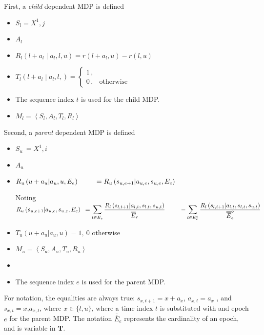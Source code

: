 \documentclass[compsoc,journal,letterpaper,10pt,draftcls,twocolumn]{IEEEtran}
\begin{document}
First, a \emph{child} dependent MDP is defined

\begin{itemize}
\item
  \(S_{l}  = X^{1}, j\)
\item
  \(A_{l}\)
\item
  \(R_{l}\left( l + a_{l}\middle| a_{l},l,u \right) = r\left( l + a_{l}, u \right) - r(l,u)\)
\item
  $T_{l}\left( l + a_{l}\middle| a_{l}, l, \right) = \left\{ \begin{array}{ll}  1\,, & \\ 0\,, & \text{otherwise} \end{array} \right.$ 
\item
  The sequence index \(t\) is used for the child MDP.
\item
  \(M_{l} = \left\langle S_{l}, A_{l} ,T_{l}, R_{l} \right\rangle\)
\end{itemize}

Second, a \emph{parent} dependent MDP is defined

\begin{itemize}
\item
  \(S_{u}\  = X^{1},i\)
\item
  \(A_{u}\)
\item
  \(R_{u}\left( u + a_{u} \middle|a_{u}, u, E_{e} \right) \\ {\ }\qquad = R_{u}\left( s_{u,e + 1}\middle| a_{u,e}, s_{u,e}, E_{e} \right)\)

    Noting\\
    \(R_{u}\left( s_{u,e + 1}|a_{u,e}, s_{u,e}, E_{e} \right) \\ {\ } = \displaystyle\sum_{t \in E_{e}}^{\ }\frac{R_{l}\left( s_{l,t + 1}|a_{l,t}, s_{l,t}, s_{u,t} \right)}{\overline{\overline E}_{e}} \\ {\ } \qquad - \displaystyle\sum_{t \in E_{e}^{o}}^{\ }\frac{R_{l}\left( s_{l,t + 1}|a_{l,t},s_{l,t},s_{u,t} \right)}{\overline{\overline E}_{e}^{o}}\)
  
\item
  \(T_{u}\left( u + a_{u}|a_{u}, u \right) = 1,\ 0\) otherwise
\item
  \(M_{u} = \left\langle S_{u}, A_{u}, T_{u}, R_{u} \right\rangle\)
\item
\item
  The sequence index \(e\) is used for the parent MDP.
\end{itemize}

For notation, the equalities are always true:
\(s_{x,t + 1} = x + a_{x}\), \(a_{x,t} = a_{x}\) ,
and\(s_{x,t} = x\),\(a_{x,t}\), where \(x \in \{ l,u\}\), where a time
index \(t\) is substituted with and epoch \(e\) for the parent MDP. The
notation \(\overline{\overline E}_{e}\) represents the cardinality of an epoch,
and is variable in \(\mathbf{T}\).
\end{document}
